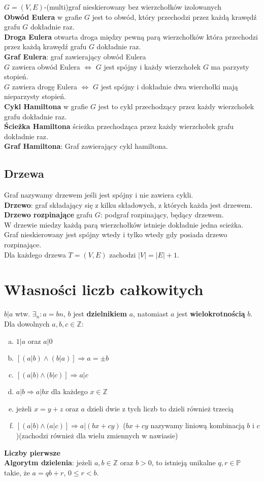 \documentclass[a4paper,12pt]{article}
\begin{document}
$G=(V,E)$-(multi)graf nieskierowany bez wierzchołków izolowanych\\
\textbf{Obwód Eulera} w grafie $G$ jest to obwód, który przechodzi przez każdą krawędź grafu $G$ dokładnie raz.\\
\textbf{Droga Eulera} otwarta droga między pewną parą wierzchołków która przechodzi przez każdą krawędź grafu $G$ dokładnie raz.\\
\textbf{Graf Eulera}: graf zawierający obwód Eulera\\
$G$ zawiera obwód Eulera $\Leftrightarrow$ $G$ jest spójny i każdy wierzchołek $G$ ma parzysty stopień. \\
$G$ zawiera drogę Eulera $\Leftrightarrow$ $G$ jest spójny i dokładnie dwa wierchołki mają nieparzysty stopień. \\
\textbf{Cykl Hamiltona} w grafie $G$ jest to cykl przechodzący przez każdy wierzchołek grafu dokładnie raz.\\
\textbf{Ścieżka Hamiltona} ścieżka przechodząca przez każdy wierzchołek grafu dokładnie raz.\\
\textbf{Graf Hamiltona}: Graf zawierający cykl hamiltona.
\subsection{Drzewa}
Graf nazywamy drzewem jeśli jest spójny i nie zawiera cykli.\\
\textbf{Drzewo}: graf składający się z kilku składowych, z których każda jest drzewem.\\
\textbf{Drzewo rozpinające} grafu $G$: podgraf rozpinający, będący drzewem.\\
W drzewie miedzy każdą parą wierzchołków istnieje dokładnie jedna scieżka.\\
Graf nieskierowany jest spójny wtedy i tylko wtedy gdy posiada drzewo rozpinające.\\
Dla każdego drzewa $T=(V,E)$ zachodzi $|V|=|E|+1$.
\section{Własności liczb całkowitych}
$b|a$ wtw. $\exists_n:a=bn$, $b$ jest \textbf{dzielnikiem} $a$, natomiast $a$ jest \textbf{wielokrotnością} $b$.\\
Dla dowolnych $a,b,c\in \mathbb{Z}$:
	\begin{enumerate}[a)]
		\item $1|a$ oraz $a|0$
		\item $[(a|b)\wedge(b|a)]\Rightarrow a=\pm b$
		\item $[(a|b)\wedge(b|c)]\Rightarrow a|c$
		\item $a|b \Rightarrow a|bx$ dla każdego $x\in\mathbb{Z}$
		\item jeżeli $x=y+z$ oraz $a$ dzieli dwie z tych liczb to dzieli również trzecią
		\item $[(a|b)\wedge(a|c)]\Rightarrow a|(bx+cy)$ ($bx+cy$ nazywamy liniową kombinacją $b$ i $c$)(zachodzi również dla wielu zmiennych w nawiasie)
	\end{enumerate}
\textbf{Liczby pierwsze}\\
\textbf{Algorytm dzielenia}: jeżeli $a, b \in \mathbb{Z}$ oraz $b>0$, to istnieją unikalne $q,r\in\mathbb{P}$ takie, że $a=qb+r$, $0\leq r <b$.
\end{document}
